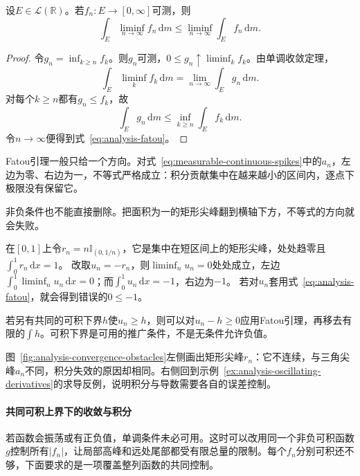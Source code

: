 \begin{lemma}[Fatou引理]
\label{lem:analysis-fatou}
设$E\in\mathcal L(\mathbb R)$。若$f_n:E\to[0,\infty]$可测，则
\begin{equation}
  \int_E\liminf_{n\to\infty}f_n\,\mathrm{d}m
  \leq
  \liminf_{n\to\infty}\int_Ef_n\,\mathrm{d}m.
\label{eq:analysis-fatou}
\end{equation}
\end{lemma}
\begin{proof}
令$g_n=\inf_{k\geq n}f_k$。则$g_n$可测，$0\leq g_n\uparrow\liminf_k f_k$。由单调收敛定理，
\[   \int_E\liminf_k f_k\,\mathrm{d}m   =   \lim_{n\to\infty}\int_E g_n\,\mathrm{d}m. \]
对每个$k\geq n$都有$g_n\leq f_k$，故
\[   \int_E g_n\,\mathrm{d}m   \leq   \inf_{k\geq n}\int_E f_k\,\mathrm{d}m. \]
令$n\to\infty$便得到式~\eqref{eq:analysis-fatou}。
\end{proof}

Fatou引理一般只给一个方向。对式~\eqref{eq:measurable-continuous-spikes}中的$a_n$，左边为零、右边为一，不等式严格成立：积分贡献集中在越来越小的区间内，逐点下极限没有保留它。

非负条件也不能直接删除。把面积为一的矩形尖峰翻到横轴下方，不等式的方向就会失败。
\begin{example}[负尖峰使Fatou不等式失效]
\label{ex:analysis-negative-spike-fatou}
在$[0,1]$上令$r_n=n\mathbb I_{(0,1/n)}$，它是集中在短区间上的矩形尖峰，处处趋零且$\int_0^1r_n\,\mathrm dx=1$。
改取$u_n=-r_n$，则$\liminf_n u_n=0$处处成立，左边$\int_0^1\liminf_nu_n\,\mathrm dx=0$；而$\int_0^1u_n\,\mathrm dx=-1$，右边为$-1$。
若对$u_n$套用式~\eqref{eq:analysis-fatou}，就会得到错误的$0\leq-1$。
\end{example}
若另有共同的可积下界$h$使$u_n\geq h$，则可以对$u_n-h\geq0$应用Fatou引理，再移去有限的$\int h$。可积下界是可用的推广条件，不是无条件允许负值。

图~\ref{fig:analysis-convergence-obstacles}左侧画出矩形尖峰$r_n$：它不连续，与三角尖峰$a_n$不同，积分失效的原因却相同。右侧回到示例~\ref{ex:analysis-oscillating-derivatives}的求导反例，说明积分与导数需要各自的误差控制。

\paragraph{共同可积上界下的收敛与积分}
若函数会振荡或有正负值，单调条件未必可用。这时可以改用同一个非负可积函数$g$控制所有$|f_n|$，让局部高峰和远处尾部都受有限总量的限制。每个$f_n$分别可积还不够，下面要求的是一项覆盖整列函数的共同控制。

